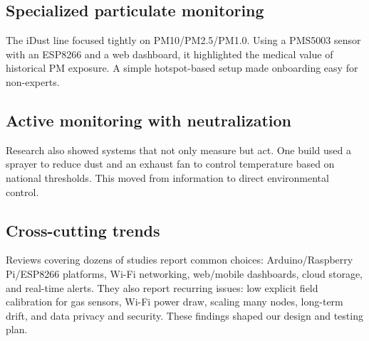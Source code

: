 \documentclass[12pt]{report}
\begin{document}
\subsection{Specialized particulate monitoring}
The iDust line focused tightly on PM10/PM2.5/PM1.0. Using a PMS5003 sensor with an ESP8266 and a web dashboard, it highlighted the medical value of historical PM exposure. A simple hotspot-based setup made onboarding easy for non-experts.

\subsection{Active monitoring with neutralization}
Research also showed systems that not only measure but act. One build used a sprayer to reduce dust and an exhaust fan to control temperature based on national thresholds. This moved from information to direct environmental control.

\subsection{Cross-cutting trends}
Reviews covering dozens of studies report common choices: Arduino/Raspberry Pi/ESP8266 platforms, Wi-Fi networking, web/mobile dashboards, cloud storage, and real-time alerts. They also report recurring issues: low explicit field calibration for gas sensors, Wi-Fi power draw, scaling many nodes, long-term drift, and data privacy and security. These findings shaped our design and testing plan.
\end{document}
